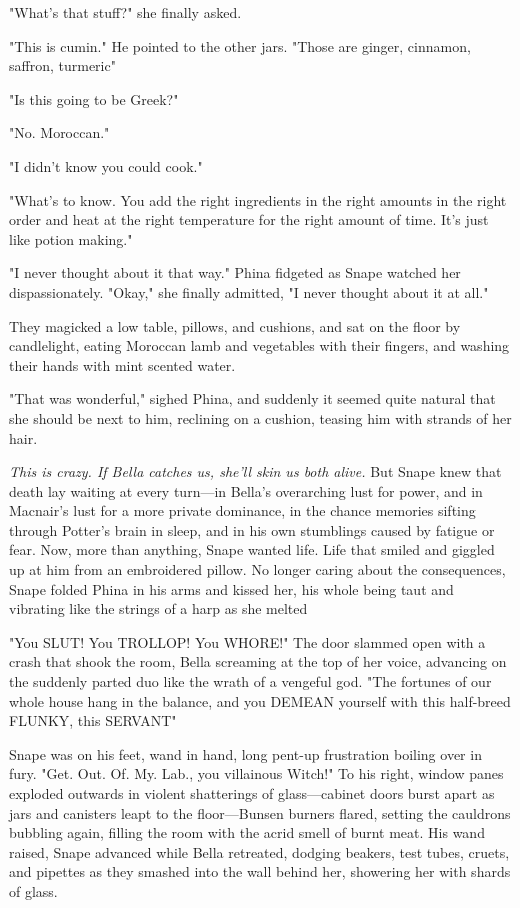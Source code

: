 "What's that stuff?" she finally asked.

"This is cumin." He pointed to the other jars. "Those are ginger, cinnamon, saffron, turmeric{\el}"

"Is this going to be Greek?"

"No. Moroccan."

"I didn't know you could cook."

"What's to know. You add the right ingredients in the right amounts in the right order and heat at the right temperature for the right amount of time. It's just like potion making."

"I never thought about it that way." Phina fidgeted as Snape watched her dispassionately. "Okay," she finally admitted, "I never thought about it at all."

They magicked a low table, pillows, and cushions, and sat on the floor by candlelight, eating Moroccan lamb and vegetables with their fingers, and washing their hands with mint scented water.

"That was wonderful," sighed Phina, and suddenly it seemed quite natural that she should be next to him, reclining on a cushion, teasing him with strands of her hair.

\emph{This is crazy. If Bella catches us, she'll skin us both alive.} But Snape knew that death lay waiting at every turn—in Bella's overarching lust for power, and in Macnair's lust for a more private dominance, in the chance memories sifting through Potter's brain in sleep, and in his own stumblings caused by fatigue or fear. Now, more than anything, Snape wanted life. Life that smiled and giggled up at him from an embroidered pillow. No longer caring about the consequences, Snape folded Phina in his arms and kissed her, his whole being taut and vibrating like the strings of a harp as she melted{\el}

"You SLUT! You TROLLOP! You WHORE!" The door slammed open with a crash that shook the room, Bella screaming at the top of her voice, advancing on the suddenly parted duo like the wrath of a vengeful god. "The fortunes of our whole house hang in the balance, and you DEMEAN yourself with this half-breed FLUNKY, this SERVANT{\el}"

Snape was on his feet, wand in hand, long pent-up frustration boiling over in fury. "Get. Out. Of. My. Lab., you villainous Witch!" To his right, window panes exploded outwards in violent shatterings of glass—cabinet doors burst apart as jars and canisters leapt to the floor—Bunsen burners flared, setting the cauldrons bubbling again, filling the room with the acrid smell of burnt meat. His wand raised, Snape advanced while Bella retreated, dodging beakers, test tubes, cruets, and pipettes as they smashed into the wall behind her, showering her with shards of glass.

